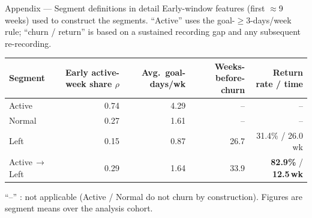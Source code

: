\documentclass[10pt,aspectratio=169]{beamer}
\newcommand{\hc}[1]{{\color{coral}\bfseries #1}}
\begin{document}
\appendix

\begin{frame}{Appendix --- Segment definitions in detail}
  {\footnotesize Early-window features (first $\approx$9 weeks) used to construct the segments. ``Active'' uses the goal-$\ge$3-days/week rule; ``churn / return'' is based on a sustained recording gap and any subsequent re-recording.}
  \vspace*{0.6em}
  \centering\footnotesize
  \renewcommand{\arraystretch}{1.25}
  \begin{tabular}{@{}l r r r r@{}}
    \toprule
    Segment & Early active-week share $\rho$ & Avg.\ goal-days/wk & Weeks-before-churn & Return rate / time\\
    \midrule
    Active            & 0.74 & 4.29 & --   & --\\
    Normal            & 0.27 & 1.61 & --   & --\\
    Left              & 0.15 & 0.87 & 26.7 & 31.4\% / 26.0 wk\\
    Active\,$\to$\,Left & 0.29 & 1.64 & 33.9 & \hc{82.9\%} / \hc{12.5\,wk}\\
    \bottomrule
  \end{tabular}
  \vfill
  {\color{graytx}\scriptsize ``--'' : not applicable (Active / Normal do not churn by construction). Figures are segment means over the analysis cohort.}
\end{frame}
\end{document}
